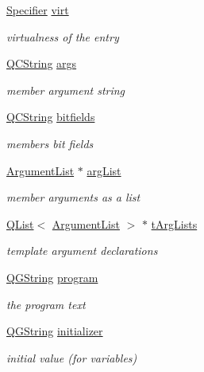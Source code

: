 \begin{DoxyCompactItemize}
\hyperlink{types_8h_ab16236bdd10ddf4d73a9847350f0017e}{Specifier} \hyperlink{class_entry_aaf045b9c026443fd192064117083911b}{virt}
\begin{DoxyCompactList}\small\item\em virtualness of the entry \end{DoxyCompactList}\item 
\hyperlink{class_q_c_string}{Q\+C\+String} \hyperlink{class_entry_a795acc50f8bb2497b2385ee715304076}{args}
\begin{DoxyCompactList}\small\item\em member argument string \end{DoxyCompactList}\item 
\hyperlink{class_q_c_string}{Q\+C\+String} \hyperlink{class_entry_a239e75c28fe009869cf25e681d2a2d41}{bitfields}
\begin{DoxyCompactList}\small\item\em member\textquotesingle{}s bit fields \end{DoxyCompactList}\item 
\hyperlink{class_argument_list}{Argument\+List} $\ast$ \hyperlink{class_entry_a7dfa4587991698fbc8550e563cd71948}{arg\+List}
\begin{DoxyCompactList}\small\item\em member arguments as a list \end{DoxyCompactList}\item 
\hyperlink{class_q_list}{Q\+List}$<$ \hyperlink{class_argument_list}{Argument\+List} $>$ $\ast$ \hyperlink{class_entry_a6fe1bee76d0edf07bdae161814b8e490}{t\+Arg\+Lists}
\begin{DoxyCompactList}\small\item\em template argument declarations \end{DoxyCompactList}\item 
\hyperlink{class_q_g_string}{Q\+G\+String} \hyperlink{class_entry_a8aa37e42f17105b914db76b0c05d0a1f}{program}
\begin{DoxyCompactList}\small\item\em the program text \end{DoxyCompactList}\item 
\hyperlink{class_q_g_string}{Q\+G\+String} \hyperlink{class_entry_a2a0c9e7ce364ed2981f49314c33245f9}{initializer}
\begin{DoxyCompactList}\small\item\em initial value (for variables) \end{DoxyCompactList}\item 

\end{DoxyCompactItemize}
